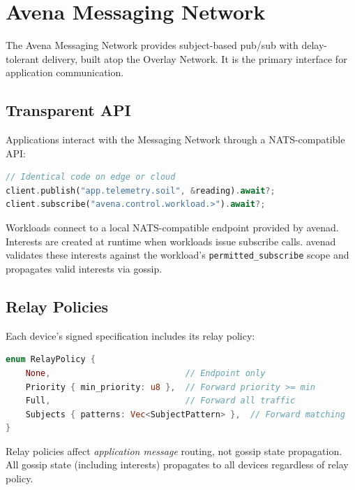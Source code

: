 
\section{Avena Messaging Network}
\label{sec:messaging}

The Avena Messaging Network provides subject-based pub/sub with delay-tolerant delivery, built atop the Overlay Network. It is the primary interface for application communication.

\subsection{Transparent API}

Applications interact with the Messaging Network through a NATS-compatible API:

\begin{lstlisting}[language=Rust]
// Identical code on edge or cloud
client.publish("app.telemetry.soil", &reading).await?;
client.subscribe("avena.control.workload.>").await?;
\end{lstlisting}

Workloads connect to a local NATS-compatible endpoint provided by avenad. Interests are created at runtime when workloads issue subscribe calls. avenad validates these interests against the workload's \texttt{permitted\_subscribe} scope and propagates valid interests via gossip.

\subsection{Relay Policies}

Each device's signed specification includes its relay policy:

\begin{lstlisting}[language=Rust]
enum RelayPolicy {
    None,                           // Endpoint only
    Priority { min_priority: u8 },  // Forward priority >= min
    Full,                           // Forward all traffic
    Subjects { patterns: Vec<SubjectPattern> },  // Forward matching
}
\end{lstlisting}

Relay policies affect \emph{application message} routing, not gossip state propagation. All gossip state (including interests) propagates to all devices regardless of relay policy.

